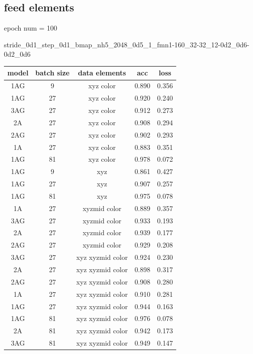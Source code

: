 \documentclass{article}
\begin{document}
\subsection{feed elements}
epoch num = 100 \par
stride\_0d1\_step\_0d1\_bmap\_nh5\_2048\_0d5\_1\_fmn1-160\_32-32\_12-0d2\_0d6-0d2\_0d6 \par
\begin{center}
	\begin{tabular}{|c |c | c || c c |} 
		\hline
		model & batch size & data elements & acc & loss \\
		\hline
		1AG & 9 & xyz color & 0.890 & 0.356\\ [0.5ex] 
		\hline
		1AG & 27 & xyz color & 0.920 & 0.240\\ [0.5ex] 
		\hline
		
		3AG & 27 & xyz color& 0.912 & 0.273 \\  [0.5ex]
		\hline
		2A & 27 & xyz color& 0.908 & 0.294 \\  [0.5ex]
		\hline
		2AG & 27 & xyz color& 0.902 & 0.293 \\  [0.5ex]
		\hline
		1A & 27 & xyz color& 0.883 & 0.351 \\  [0.5ex]
		\hline
		1AG & 81 & xyz color & 0.978 & 0.072\\ [0.5ex] 
		\hline\hline
		
		1AG & 9 & xyz  & 0.861 & 0.427\\ [0.5ex] 
		\hline
		1AG & 27 & xyz & 0.907 & 0.257\\ [0.5ex] 
		\hline
		1AG & 81 & xyz & 0.975 & 0.078 \\  [0.5ex]
		\hline\hline
		1A & 27 & xyzmid color& 0.889 & 0.357 \\  [0.5ex]
		\hline
		3AG & 27 & xyzmid color& 0.933 & 0.193 \\  [0.5ex]
		\hline
		
		2A & 27 & xyzmid color& 0.939 & 0.177 \\  [0.5ex]
		\hline
		
		2AG & 27 & xyzmid color& 0.929 & 0.208 \\  [0.5ex]
		\hline\hline
		3AG & 27 & xyz xyzmid color& 0.924 & 0.230 \\  [0.5ex]
		\hline
		
		2A & 27 & xyz xyzmid color& 0.898 & 0.317 \\  [0.5ex]
		\hline
		2AG & 27 & xyz xyzmid color& 0.908 & 0.280 \\  [0.5ex]
		\hline
		1A & 27 & xyz xyzmid color& 0.910 & 0.281 \\  [0.5ex]
		\hline
		1AG & 27 & xyz xyzmid color& 0.944 & 0.163 \\  [0.5ex]
		\hline
		1AG & 81 & xyz xyzmid color& 0.976 & 0.078 \\  [0.5ex]
		\hline
		2A & 81 & xyz xyzmid color& 0.942 & 0.173 \\  [0.5ex]
		\hline
		3AG & 81 & xyz xyzmid color& 0.949 & 0.147 \\  [0.5ex]
		\hline
	\end{tabular}
\end{center}
\end{document}
